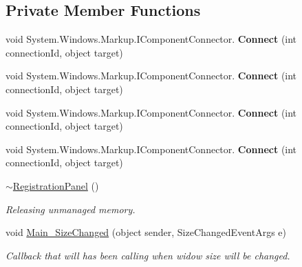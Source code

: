 \subsection*{Private Member Functions}
\begin{DoxyCompactItemize}
\item 
\mbox{\label{class_wpf_handler_1_1_u_i_1_1_controls_1_1_logon_1_1_registration_panel_abe43d5c4cbe12784e4da3d78df3ff1c1}} 
void System.\+Windows.\+Markup.\+I\+Component\+Connector. {\bfseries Connect} (int connection\+Id, object target)
\item 
\mbox{\label{class_wpf_handler_1_1_u_i_1_1_controls_1_1_logon_1_1_registration_panel_abe43d5c4cbe12784e4da3d78df3ff1c1}} 
void System.\+Windows.\+Markup.\+I\+Component\+Connector. {\bfseries Connect} (int connection\+Id, object target)
\item 
\mbox{\label{class_wpf_handler_1_1_u_i_1_1_controls_1_1_logon_1_1_registration_panel_abe43d5c4cbe12784e4da3d78df3ff1c1}} 
void System.\+Windows.\+Markup.\+I\+Component\+Connector. {\bfseries Connect} (int connection\+Id, object target)
\item 
\mbox{\label{class_wpf_handler_1_1_u_i_1_1_controls_1_1_logon_1_1_registration_panel_abe43d5c4cbe12784e4da3d78df3ff1c1}} 
void System.\+Windows.\+Markup.\+I\+Component\+Connector. {\bfseries Connect} (int connection\+Id, object target)
\item 
\mbox{\hyperlink{class_wpf_handler_1_1_u_i_1_1_controls_1_1_logon_1_1_registration_panel_a9453dfee5457f47b9fe0fc25ed3028ba}{$\sim$\+Registration\+Panel}} ()
\begin{DoxyCompactList}\small\item\em Releasing unmanaged memory. \end{DoxyCompactList}\item 
void \mbox{\hyperlink{class_wpf_handler_1_1_u_i_1_1_controls_1_1_logon_1_1_registration_panel_a7d0af81f95e8d36205e5e12647a526f2}{Main\+\_\+\+Size\+Changed}} (object sender, Size\+Changed\+Event\+Args e)
\begin{DoxyCompactList}\small\item\em Callback that will has been calling when widow size will be changed. \end{DoxyCompactList}\item 

\end{DoxyCompactItemize}
